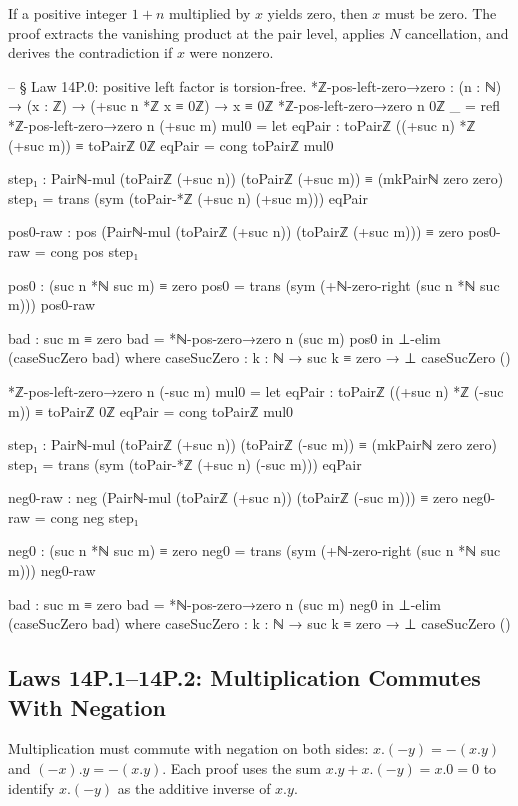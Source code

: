 \documentclass[11pt,a4paper]{book}
\def\cdot{.}%
\def\mathbb#1{#1}%
\begin{document}
If a positive integer $1+n$ multiplied by $x$ yields zero, then $x$ must be zero.
The proof extracts the vanishing product at the pair level, applies $\mathbb{N}$ cancellation, and derives the contradiction if $x$ were nonzero.

\begin{code}
-- § Law 14P.0: positive left factor is torsion-free.
*ℤ-pos-left-zero→zero : (n : ℕ) → (x : ℤ) → (+suc n *ℤ x ≡ 0ℤ) → x ≡ 0ℤ
*ℤ-pos-left-zero→zero n 0ℤ _ = refl
*ℤ-pos-left-zero→zero n (+suc m) mul0 =
  let
    eqPair : toPairℤ ((+suc n) *ℤ (+suc m)) ≡ toPairℤ 0ℤ
    eqPair = cong toPairℤ mul0

    step₁ : Pairℕ-mul (toPairℤ (+suc n)) (toPairℤ (+suc m)) ≡ (mkPairℕ zero zero)
    step₁ = trans (sym (toPair-*ℤ (+suc n) (+suc m))) eqPair

    pos0-raw : pos (Pairℕ-mul (toPairℤ (+suc n)) (toPairℤ (+suc m))) ≡ zero
    pos0-raw = cong pos step₁

    pos0 : (suc n *ℕ suc m) ≡ zero
    pos0 =
      trans
        (sym (+ℕ-zero-right (suc n *ℕ suc m)))
        pos0-raw

    bad : suc m ≡ zero
    bad = *ℕ-pos-zero→zero n (suc m) pos0
  in
  ⊥-elim (caseSucZero bad)
  where
    caseSucZero : {k : ℕ} → suc k ≡ zero → ⊥
    caseSucZero ()

*ℤ-pos-left-zero→zero n (-suc m) mul0 =
  let
    eqPair : toPairℤ ((+suc n) *ℤ (-suc m)) ≡ toPairℤ 0ℤ
    eqPair = cong toPairℤ mul0

    step₁ : Pairℕ-mul (toPairℤ (+suc n)) (toPairℤ (-suc m)) ≡ (mkPairℕ zero zero)
    step₁ = trans (sym (toPair-*ℤ (+suc n) (-suc m))) eqPair

    neg0-raw : neg (Pairℕ-mul (toPairℤ (+suc n)) (toPairℤ (-suc m))) ≡ zero
    neg0-raw = cong neg step₁

    neg0 : (suc n *ℕ suc m) ≡ zero
    neg0 =
      trans
        (sym (+ℕ-zero-right (suc n *ℕ suc m)))
        neg0-raw

    bad : suc m ≡ zero
    bad = *ℕ-pos-zero→zero n (suc m) neg0
  in
  ⊥-elim (caseSucZero bad)
  where
    caseSucZero : {k : ℕ} → suc k ≡ zero → ⊥
    caseSucZero ()
\end{code}

\subsection{Laws 14P.1--14P.2: Multiplication Commutes With Negation}

Multiplication must commute with negation on both sides: $x \cdot (-y) = -(x \cdot y)$ and $(-x) \cdot y = -(x \cdot y)$.
Each proof uses the sum $x \cdot y + x \cdot (-y) = x \cdot 0 = 0$ to identify $x \cdot (-y)$ as the additive inverse of $x \cdot y$.
\end{document}

